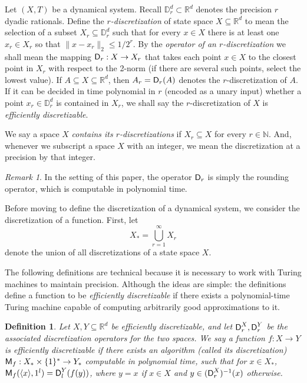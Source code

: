 \documentclass{amsart}
\theoremstyle{theorem}
\newtheorem{definition}[theorem]{Definition}
\theoremstyle{remark}
\newtheorem{remark}[theorem]{Remark}
\numberwithin{equation}{section}
\newcommand{\DD}{\mathbb{D}}
\newcommand{\NN}{\mathbb{N}}
\newcommand{\RR}{\mathbb{R}}
\newcommand{\ccD}{\textsf{\upshape D}}
\newcommand{\ccM}{\textsf{\upshape M}}
\begin{document}
Let $(X, T)$ be a dynamical system. Recall $\DD_r^d \subset \RR^d$ denotes the precision $r$ dyadic rationals. Define the \emph{$r$-discretization} of state space $X\subseteq \RR^d$ to mean the selection of a subset $X_r \subseteq \DD_r^d$ such that for every $x \in X$ there is at least one $x_r \in X_r$ so that $\|x - x_r\|_2 \leq 1/2^r$.
By the \emph{operator of an $r$-discretization} we shall mean the mapping $\ccD_r:X\rightarrow X_r$ that takes each point $x \in X$ to the closest point in $X_r$ with respect to the 2-norm (if there are several such points, select the lowest value).
If $A \subseteq X \subseteq \RR^d$, then $A_r = \ccD_r(A)$ denotes the $r$-discretization of $A$.
If it can be decided in time polynomial in $r$ (encoded as a unary input) whether a point $x_r \in \DD_r^d$ is contained in $X_r$, we shall say the $r$-discretization of $X$ is \emph{efficiently discretizable}.

We say a space $X$ \emph{contains its $r$-discretizations} if $X_r \subseteq X$ for every $r \in \NN$. And, whenever we subscript a space $X$ with an integer, we mean the discretization at a precision by that integer.

\begin{remark}
In the setting of this paper, the operator $\ccD_r$ is simply the rounding operator, which is computable in polynomial time.
\end{remark}

Before moving to define the discretization of a dynamical system, we consider the discretization of a function. First, let
\[
X_* = \bigcup_{r=1}^\infty X_r
\]
denote the union of all discretizations of a state space $X$.

The following definitions are technical because it is necessary to work with Turing machines to maintain precision. Although the ideas are simple: the definitions define a function to be \emph{efficiently discretizable} if there exists a polynomial-time Turing machine capable of computing arbitrarily good approximations to it.

\begin{definition}\label{defFuncDisc}
Let $X, Y \subseteq \RR^d$ be efficiently discretizable, and let $\ccD_r^X, \ccD_r^Y$ be the associated discretization operators for the two spaces. We say a function $f:X\rightarrow Y$ is \emph{efficiently discretizable} if there exists an algorithm (called its \emph{discretization}) $\ccM_f:X_*\times \{1\}^* \rightarrow Y_*$ computable in polynomial time, such that for $x \in X_*$, $\ccM_f(\langle x\rangle, 1^l) = \ccD^Y_l(f(y))$, where $y=x$ if $x \in X$ and $y \in (\ccD_r^X)^{-1}(x)$ otherwise.
\end{definition}
\end{document}
